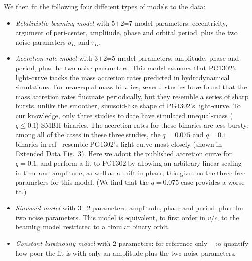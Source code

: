 We then fit the following four different types of models to the data:
%
\begin{itemize}
\item {\it Relativistic beaming model} with 5+2=7 model parameters:
  eccentricity, argument of peri-center, amplitude, phase and orbital
  period, plus the two noise parameters $\sigma_D$ and $\tau_D$.
\item {\it Accretion rate model} with 3+2=5 model parameters:
  amplitude, phase and period, plus the two noise parameters.  This
  model assumes that PG1302's light-curve tracks the mass accretion
  rates predicted in hydrodynamical simulations.  For near-equal mass
  binaries, several studies have found that the mass accretion rates
  fluctuate periodically, but they resemble a series of sharp bursts,
  unlike the smoother, sinusoid-like shape of PG1302's light-curve.
  To our knowledge, only three studies to date have simulated
  unequal-mass ($q\leq 0.1$) SMBH
  binaries\cite{DHM:2013:MNRAS,Farris:2014,ShiKrolik:2015}. The accretion
  rates for these binaries are less bursty; among all of the cases in
  these three studies, the $q=0.075$ and $q=0.1$ binaries in
  ref~\cite{DHM:2013:MNRAS} resemble PG1302's light-curve most closely
  (shown in Extended Data Fig.~3).  Here we adopt the published
  accretion curve for $q=0.1$, and perform a fit to PG1302 by
  allowing an arbitrary linear scaling in time and amplitude, as well
  as a shift in phase; this gives us the three free parameters for
  this model.  (We find that the $q=0.075$ case provides a worse fit.)
\item {\it Sinusoid model} with 3+2 parameters: amplitude, phase and
  period, plus the two noise parameters. This model is equivalent, to
  first order in $v/c$, to the beaming model restricted to a circular
  binary orbit.
\item {\it Constant luminosity model} with 2 parameters: for
  reference only -- to quantify how poor the fit is with only an
  amplitude plus the two noise parameters.

\end{itemize}
%

